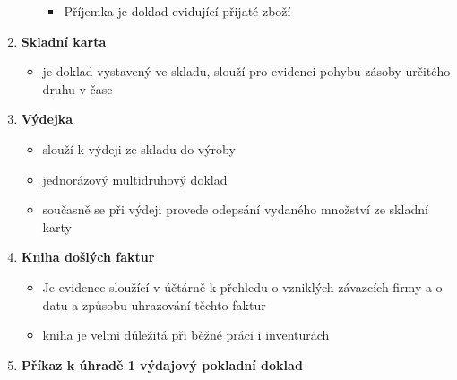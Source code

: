 \begin{enumerate}
\begin{itemize}
\begin{itemize}
                    \item Příjemka je doklad evidující přijaté zboží
                \end{itemize}
        \end{itemize}
    \item \textbf{Skladní karta}
        \begin{itemize}
            \item je doklad vystavený ve skladu, slouží pro evidenci pohybu zásoby určitého druhu v čase
        \end{itemize}
    \item \textbf{Výdejka}
        \begin{itemize}
            \item slouží k výdeji ze skladu do výroby
            \item jednorázový multidruhový doklad
            \item současně se při výdeji provede odepsání vydaného množství ze skladní karty
        \end{itemize}
    \item \textbf{Kniha došlých faktur}
        \begin{itemize}
            \item Je evidence sloužící v účtárně k přehledu o vzniklých závazcích firmy a o datu a způsobu uhrazování těchto faktur
            \item kniha je velmi důležitá při běžné práci i inventurách
        \end{itemize}
    \item \textbf{Příkaz k úhradě 1 výdajový pokladní doklad}
\end{enumerate}


